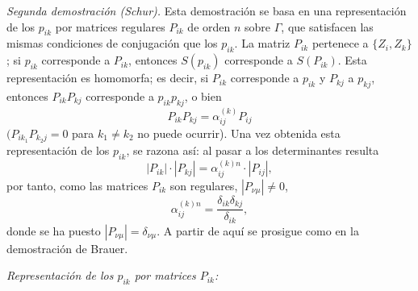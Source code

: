 \emph{Segunda demostración (Schur).} Esta demostración se basa en una representación de los \(p_{ik}\) por matrices regulares \(P_{ik}\) de orden \(n\) sobre \(\Gamma\), que satisfacen las mismas condiciones de conjugación que los \(p_{ik}\). La matriz \(P_{ik}\) pertenece a \(\{Z_i,Z_k\}\); si \(p_{ik}\) corresponde a \(P_{ik}\), entonces \(S(p_{ik})\) corresponde a \(S(P_{ik})\). Esta representación es homomorfa; es decir, si \(P_{ik}\) corresponde a \(p_{ik}\) y \(P_{kj}\) a \(p_{kj}\), entonces \(P_{ik}P_{kj}\) corresponde a \(p_{ik}p_{kj}\), o bien
\[
P_{ik}P_{kj}=\alpha_{ij}^{(k)}P_{ij}
\]
\((P_{ik_1}P_{k_2j}=0\) para \(k_1\neq k_2\) no puede ocurrir). Una vez obtenida esta representación de los \(p_{ik}\), se razona así: al pasar a los determinantes resulta
\[
|P_{ik}|\cdot |P_{kj}|=\alpha_{ij}^{(k)n}\cdot |P_{ij}|,
\]
por tanto, como las matrices \(P_{ik}\) son regulares, \(|P_{\nu\mu}|\ne0\),
\[
\alpha_{ij}^{(k)n}=\frac{\delta_{ik}\delta_{kj}}{\delta_{ik}},
\]
donde se ha puesto \(|P_{\nu\mu}|=\delta_{\nu\mu}\). A partir de aquí se prosigue como en la demostración de Brauer.

\emph{Representación de los \(p_{ik}\) por matrices \(P_{ik}\):}

